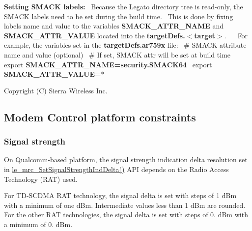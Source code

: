 {\bfseries Setting S\+M\+A\+CK labels\+:}~\newline
 Because the Legato directory tree is read-\/only, the S\+M\+A\+CK labels need to be set during the build time.~\newline
 This is done by fixing labels name and value to the variables {\bfseries {\ttfamily S\+M\+A\+C\+K\+\_\+\+A\+T\+T\+R\+\_\+\+N\+A\+ME}} and {\bfseries {\ttfamily S\+M\+A\+C\+K\+\_\+\+A\+T\+T\+R\+\_\+\+V\+A\+L\+UE}} located into the {\bfseries {\ttfamily target\+Defs.$<$target$>$}}.~\newline
 ~\newline
 For example, the variables set in the {\bfseries {\ttfamily target\+Defs.\+ar759x}} file\+:~\newline
 {\ttfamily \# S\+M\+A\+CK attribute name and value (optional)}~\newline
 {\ttfamily \# If set, S\+M\+A\+CK attr will be set at build time}~\newline
 {\ttfamily export {\bfseries S\+M\+A\+C\+K\+\_\+\+A\+T\+T\+R\+\_\+\+N\+A\+ME=security.\+S\+M\+A\+C\+K64}}~\newline
 {\ttfamily export {\bfseries S\+M\+A\+C\+K\+\_\+\+A\+T\+T\+R\+\_\+\+V\+A\+L\+UE=$\ast$}}~\newline


Copyright (C) Sierra Wireless Inc. \hypertarget{platformConstraintsMdc}{}\subsection{Modem Control platform constraints}\label{platformConstraintsMdc}
\hypertarget{platformConstraintsMdc_mrc_SetSignalStrengthIndDelta}{}\subsubsection{Signal strength}\label{platformConstraintsMdc_mrc_SetSignalStrengthIndDelta}
On Qualcomm-\/based platform, the signal strength indication delta resolution set in \hyperlink{le__mrc__interface_8h_a0f2b4015962c83ec9a74ee68f7b509fd}{le\+\_\+mrc\+\_\+\+Set\+Signal\+Strength\+Ind\+Delta()} A\+PI depends on the Radio Access Technology (R\+AT) used.

For T\+D-\/\+S\+C\+D\+MA R\+AT technology, the signal delta is set with steps of 1 d\+Bm with a minimum of one d\+Bm. Intermediate values less than 1 d\+Bm are rounded. For the other R\+AT technologies, the signal delta is set with steps of 0. d\+Bm with a minimum of 0. d\+Bm.

